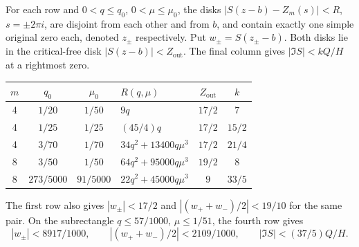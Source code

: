 \begin{proposition}\label{lt:q04mu04}\label{lt:q05mu02}\label{lt:W8}
For each row and $0<q\le q_0$, $0<\mu\le\mu_0$, the disks
$|S(z-b)-Z_m(s)|<R$, $s=\pm2\pi i$, are disjoint from each other
and from $b$, and contain exactly one simple original zero each,
denoted $z_\pm$ respectively.
Put $w_\pm=S(z_\pm-b)$. Both disks lie in the critical-free
disk $|S(z-b)|<Z_{\mathrm{out}}$. The final column gives
$|\Im S|<kQ/H$ at a rightmost zero.
\begin{center}\small
\begin{tabular}{ccclcc}
\toprule
$m$&$q_0$&$\mu_0$&$R(q,\mu)$&$Z_{\mathrm{out}}$&$k$\\\midrule
4&$1/20$&$1/50$&$9q$&$17/2$&$7$\\
4&$1/25$&$1/25$&$(45/4)q$&$17/2$&$15/2$\\
4&$3/70$&$1/70$&$34q^2+13400q\mu^3$&$17/2$&$21/4$\\
8&$3/50$&$1/50$&$64q^2+95000q\mu^3$&$19/2$&$8$\\
8&$273/5000$&$91/5000$&$22q^2+45000q\mu^3$&$9$&$33/5$\\\bottomrule
\end{tabular}
\end{center}
The first row also gives $|w_\pm|<17/2$ and
$|(w_++w_-)/2|<19/10$ for the same pair.
On the subrectangle $q\le57/1000$, $\mu\le1/51$, the fourth row gives
\begin{equation}\label{lt:Q057}
 |w_\pm|<8917/1000,\qquad
 |(w_++w_-)/2|<2109/1000,\qquad |\Im S|<(37/5)Q/H.
\end{equation}
\end{proposition}
